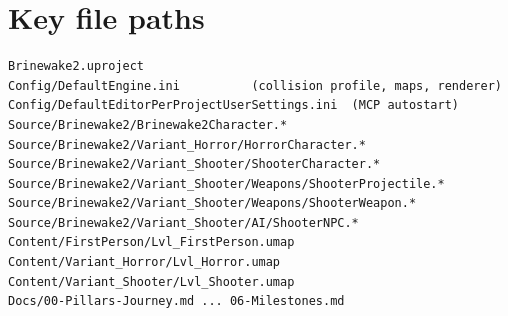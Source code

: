 \documentclass[11pt,a4paper]{article}
\begin{document}
\appendix
\section{Key file paths}
\begin{lstlisting}
Brinewake2.uproject
Config/DefaultEngine.ini          (collision profile, maps, renderer)
Config/DefaultEditorPerProjectUserSettings.ini  (MCP autostart)
Source/Brinewake2/Brinewake2Character.*
Source/Brinewake2/Variant_Horror/HorrorCharacter.*
Source/Brinewake2/Variant_Shooter/ShooterCharacter.*
Source/Brinewake2/Variant_Shooter/Weapons/ShooterProjectile.*
Source/Brinewake2/Variant_Shooter/Weapons/ShooterWeapon.*
Source/Brinewake2/Variant_Shooter/AI/ShooterNPC.*
Content/FirstPerson/Lvl_FirstPerson.umap
Content/Variant_Horror/Lvl_Horror.umap
Content/Variant_Shooter/Lvl_Shooter.umap
Docs/00-Pillars-Journey.md ... 06-Milestones.md
\end{lstlisting}
\end{document}

